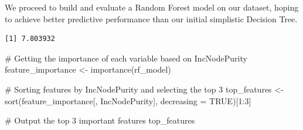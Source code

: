 \documentclass[
  super,
  preprint,
  3p]{elsarticle}
\newenvironment{Shaded}{\begin{snugshade}}{\end{snugshade}}
\newcommand{\AttributeTok}[1]{\textcolor[rgb]{0.40,0.45,0.13}{#1}}
\newcommand{\CommentTok}[1]{\textcolor[rgb]{0.37,0.37,0.37}{#1}}
\newcommand{\ConstantTok}[1]{\textcolor[rgb]{0.56,0.35,0.01}{#1}}
\newcommand{\DecValTok}[1]{\textcolor[rgb]{0.68,0.00,0.00}{#1}}
\newcommand{\FloatTok}[1]{\textcolor[rgb]{0.68,0.00,0.00}{#1}}
\newcommand{\FunctionTok}[1]{\textcolor[rgb]{0.28,0.35,0.67}{#1}}
\newcommand{\NormalTok}[1]{\textcolor[rgb]{0.00,0.23,0.31}{#1}}
\newcommand{\OtherTok}[1]{\textcolor[rgb]{0.00,0.23,0.31}{#1}}
\newcommand{\SpecialCharTok}[1]{\textcolor[rgb]{0.37,0.37,0.37}{#1}}
\newcommand{\StringTok}[1]{\textcolor[rgb]{0.13,0.47,0.30}{#1}}
\begin{document}
We proceed to build and evaluate a Random Forest model on our dataset,
hoping to achieve better predictive performance than our initial
simplistic Decision Tree.

\begin{Shaded}
\end{Shaded}

\begin{verbatim}
[1] 7.803932
\end{verbatim}

\begin{Shaded}
\begin{Highlighting}[]
\CommentTok{\# Getting the importance of each variable based on IncNodePurity}
\NormalTok{feature\_importance }\OtherTok{\textless{}{-}} \FunctionTok{importance}\NormalTok{(rf\_model)}

\CommentTok{\# Sorting features by IncNodePurity and selecting the top 3}
\NormalTok{top\_features }\OtherTok{\textless{}{-}} \FunctionTok{sort}\NormalTok{(feature\_importance[, }\StringTok{\textquotesingle{}IncNodePurity\textquotesingle{}}\NormalTok{], }\AttributeTok{decreasing =} \ConstantTok{TRUE}\NormalTok{)[}\DecValTok{1}\SpecialCharTok{:}\DecValTok{3}\NormalTok{]}

\CommentTok{\# Output the top 3 important features}
\NormalTok{top\_features}
\end{Highlighting}
\end{Shaded}
\end{document}
